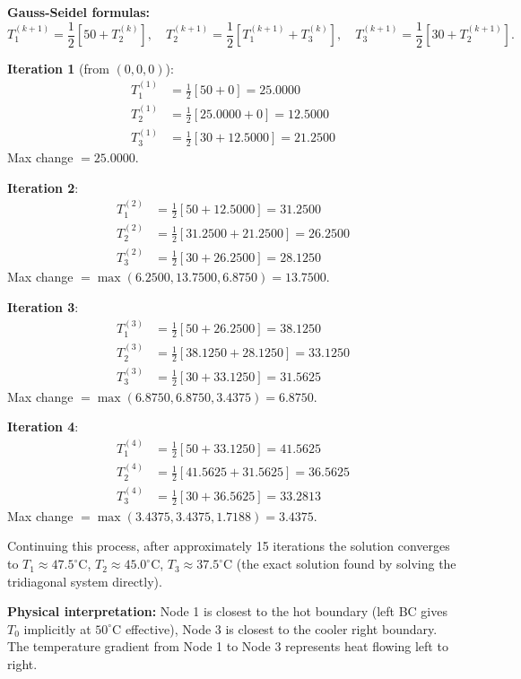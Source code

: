 \documentclass[12pt,a4paper]{article}
\begin{document}
\textbf{Gauss-Seidel formulas:}
\[
T_1^{(k+1)} = \frac{1}{2}\!\left[50 + T_2^{(k)}\right], \quad
T_2^{(k+1)} = \frac{1}{2}\!\left[T_1^{(k+1)} + T_3^{(k)}\right], \quad
T_3^{(k+1)} = \frac{1}{2}\!\left[30 + T_2^{(k+1)}\right].
\]

\textbf{Iteration 1} (from \((0,0,0)\)):
\begin{align*}
T_1^{(1)} &= \tfrac{1}{2}[50 + 0] = 25.0000 \\
T_2^{(1)} &= \tfrac{1}{2}[25.0000 + 0] = 12.5000 \\
T_3^{(1)} &= \tfrac{1}{2}[30 + 12.5000] = 21.2500
\end{align*}
Max change \(= 25.0000\).

\textbf{Iteration 2}:
\begin{align*}
T_1^{(2)} &= \tfrac{1}{2}[50 + 12.5000] = 31.2500 \\
T_2^{(2)} &= \tfrac{1}{2}[31.2500 + 21.2500] = 26.2500 \\
T_3^{(2)} &= \tfrac{1}{2}[30 + 26.2500] = 28.1250
\end{align*}
Max change \(= \max(6.2500, 13.7500, 6.8750) = 13.7500\).

\textbf{Iteration 3}:
\begin{align*}
T_1^{(3)} &= \tfrac{1}{2}[50 + 26.2500] = 38.1250 \\
T_2^{(3)} &= \tfrac{1}{2}[38.1250 + 28.1250] = 33.1250 \\
T_3^{(3)} &= \tfrac{1}{2}[30 + 33.1250] = 31.5625
\end{align*}
Max change \(= \max(6.8750, 6.8750, 3.4375) = 6.8750\).

\textbf{Iteration 4}:
\begin{align*}
T_1^{(4)} &= \tfrac{1}{2}[50 + 33.1250] = 41.5625 \\
T_2^{(4)} &= \tfrac{1}{2}[41.5625 + 31.5625] = 36.5625 \\
T_3^{(4)} &= \tfrac{1}{2}[30 + 36.5625] = 33.2813
\end{align*}
Max change \(= \max(3.4375, 3.4375, 1.7188) = 3.4375\).

Continuing this process, after approximately 15 iterations the solution converges to
\(T_1 \approx 47.5^{\circ}\)C, \(T_2 \approx 45.0^{\circ}\)C, \(T_3 \approx 37.5^{\circ}\)C
(the exact solution found by solving the tridiagonal system directly).

\textbf{Physical interpretation:} Node 1 is closest to the hot boundary (left BC gives
\(T_0\) implicitly at \(50^{\circ}\)C effective), Node 3 is closest to the cooler right
boundary. The temperature gradient from Node 1 to Node 3 represents heat flowing left to right.
\end{document}
